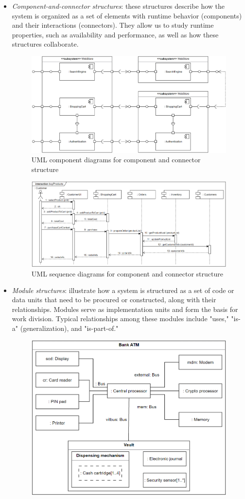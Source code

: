 \begin{itemize}
    \item \textit{Component-and-connector structures}: these structures describe how the system is organized as a set of elements with runtime behavior (components) and their interactions (connectors). 
        They allow us to study runtime properties, such as availability and performance, as well as how these structures collaborate.
        \begin{figure}[H]
            \centering
            \includegraphics[width=0.75\linewidth]{images/component1.png}
            \caption{UML component diagrams for component and connector structure}
        \end{figure}
        \begin{figure}[H]
            \centering
            \includegraphics[width=0.75\linewidth]{images/component2.png}
            \caption{UML sequence diagrams for component and connector structure}
        \end{figure}
    \item \textit{Module structures}: illustrate how a system is structured as a set of code or data units that need to be procured or constructed, along with their relationships. 
        Modules serve as implementation units and form the basis for work division.
        Typical relationships among these modules include "uses," "is-a" (generalization), and "is-part-of."
        \begin{figure}[H]
            \centering
            \includegraphics[width=0.75\linewidth]{images/modular1.png}

\end{figure}
\end{itemize}
